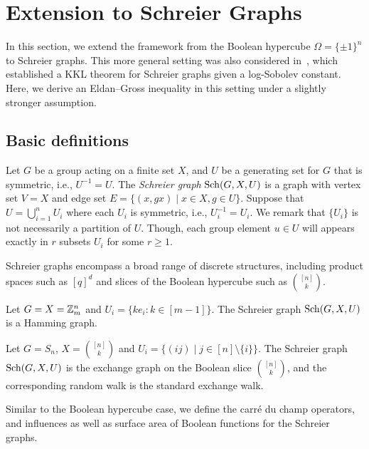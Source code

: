 \section{Extension to Schreier Graphs}
In this section, we extend the framework from the Boolean hypercube $\Omega=\{\pm 1\}^n$ to Schreier graphs. This more general setting was also considered in~\cite{ODonnellWimmer13,ODonnellWimmerSharp13,CorderoErausquinLedoux12}, which established a KKL theorem for Schreier graphs given a log-Sobolev constant. Here, we derive an Eldan--Gross inequality in this setting under a slightly stronger assumption.

\subsection{Basic definitions}
Let $G$ be a group acting on a finite set $X$, and $U$ be a generating set for $G$ that is symmetric, i.e., $U^{-1} = U$. The \emph{Schreier graph} $\mathrm{Sch}(G,X,U)$ is a graph with vertex set $V = X$ and edge set $E = \{(x,gx) \mid x \in X, g \in U\}$. Suppose that $U = \bigcup_{i=1}^n U_i$ where each $U_i$ is symmetric, i.e., $U_i^{-1} = U_i$. We remark that $\{U_i\}$ is not necessarily a partition of $U$. {\color{red} Though, each group element $u \in U$ will appears exactly in $r$ subsets $U_i$ for some $r \ge 1$.}

Schreier graphs encompass a broad range of discrete structures, including product spaces such as $[q]^d$ and slices of the Boolean hypercube such as $\binom{[n]}{k}$.
\begin{example}\label{example:SGraph}
    Let $G = X = \mathbb{Z}_m^n$ and $U_i = \{k e_i: k \in [m-1]\}$. The Schreier graph $\mathrm{Sch}(G,X,U)$ is a Hamming graph.
\end{example}

\begin{example}
    Let $G = S_n$, $X = \binom{[n]}{k}$ and $U_i = \{(ij) \mid j \in [n] \setminus \{i\}\}$. The Schreier graph $\mathrm{Sch}(G,X,U)$ is the exchange graph on the Boolean slice $\binom{[n]}{k}$, and the corresponding random walk is the standard exchange walk.
\end{example}

Similar to the Boolean hypercube case, we define the carr\'e du champ operators, and influences as well as surface area of Boolean functions for the Schreier graphs.

